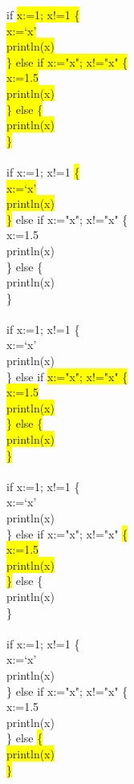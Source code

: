 \documentclass[11pt]{article}
\newcommand{\hl}[1]{\colorbox{yellow}{#1}}
\begin{document}
\t{
	if \hl{x:=1; x!=1 \{		}		\\
	\hl{\indent x:=`x'		}		\\
	\hl{\indent println(x)		}		\\
	\hl{\} else if x:="x"; x!="x" \{	}	\\
	\hl{\indent x:=1.5	}			\\
	\hl{\indent println(x)	}			\\
	\hl{\} else \{		}			\\
	\hl{\indent println(x)	}			\\
	\hl{\}}
}\\ \ \\ 
\t{
	if x:=1; x!=1 \hl{\{		}		\\
	\hl{\indent x:=`x'		}		\\
	\hl{\indent println(x)		}		\\
	\hl{\}} else if x:="x"; x!="x" \{		\\
	\indent x:=1.5				\\
	\indent println(x)				\\
	\} else \{					\\
	\indent println(x)				\\
	\}
}\\ \ \\ 
\t{
	if x:=1; x!=1 \{				\\
	\indent x:=`x'				\\
	\indent println(x)				\\
	\} else if \hl{x:="x"; x!="x" \{	}	\\
	\hl{\indent x:=1.5	}			\\
	\hl{\indent println(x)	}			\\
	\hl{\} else \{		}			\\
	\hl{\indent println(x)	}			\\
	\hl{\}}
}\\ \ \\ 
\t{
	if x:=1; x!=1 \{				\\
	\indent x:=`x'				\\
	\indent println(x)				\\
	\} else if x:="x"; x!="x" \hl{\{	}	\\
	\hl{\indent x:=1.5	}			\\
	\hl{\indent println(x)	}			\\
	\hl{\}} else \{					\\
	\indent println(x)				\\
	\}
}\\ \ \\ 
\t{
	if x:=1; x!=1 \{				\\
	\indent x:=`x'				\\
	\indent println(x)				\\
	\} else if x:="x"; x!="x" \{		\\
	\indent x:=1.5				\\
	\indent println(x)				\\
	\} else \hl{\{		}			\\
	\hl{\indent println(x)	}			\\
	\hl{\}}
}\\ \ \\
\end{document}
